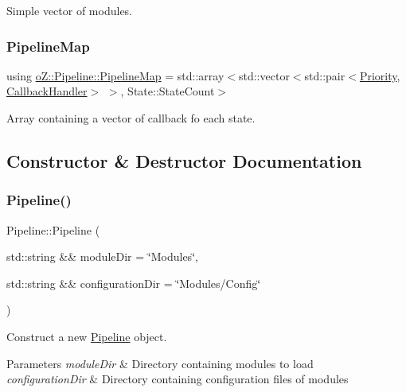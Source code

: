 Simple vector of modules. 

\mbox{\label{classo_z_1_1_pipeline_ae4082276a9a2bafefab47a1298feec67}} 
\subsubsection{\texorpdfstring{PipelineMap}{PipelineMap}}
{\footnotesize\ttfamily using \mbox{\hyperlink{classo_z_1_1_pipeline_ae4082276a9a2bafefab47a1298feec67}{o\+Z\+::\+Pipeline\+::\+Pipeline\+Map}} =  std\+::array$<$std\+::vector$<$std\+::pair$<$\mbox{\hyperlink{namespaceo_z_af05a92eb185d18369e9b4acdcd9dcd12}{Priority}}, \mbox{\hyperlink{classo_z_1_1_pipeline_a5a71ea2f2d4be5b82589c1b8175722f4}{Callback\+Handler}}$>$ $>$, State\+::\+State\+Count$>$}



Array containing a vector of callback fo each state. 



\subsection{Constructor \& Destructor Documentation}
\mbox{\label{classo_z_1_1_pipeline_a5fc2efefb6e953ce5a4f8d7d3437619a}} 
\subsubsection{\texorpdfstring{Pipeline()}{Pipeline()}\hspace{0.1cm}{\footnotesize\ttfamily [1/3]}}
{\footnotesize\ttfamily Pipeline\+::\+Pipeline (\begin{DoxyParamCaption}\item[{std\+::string \&\&}]{module\+Dir = {\ttfamily \char`\"{}Modules\char`\"{}},  }\item[{std\+::string \&\&}]{configuration\+Dir = {\ttfamily \char`\"{}Modules/Config\char`\"{}} }\end{DoxyParamCaption})}



Construct a new \mbox{\hyperlink{classo_z_1_1_pipeline}{Pipeline}} object. 


\begin{DoxyParams}{Parameters}
{\em module\+Dir} & Directory containing modules to load \\
\hline
{\em configuration\+Dir} & Directory containing configuration files of modules \\
\hline
\end{DoxyParams}
\mbox{\label{classo_z_1_1_pipeline_ab1d6cd9a6b71cae2b5ebe0031b945237}} 
